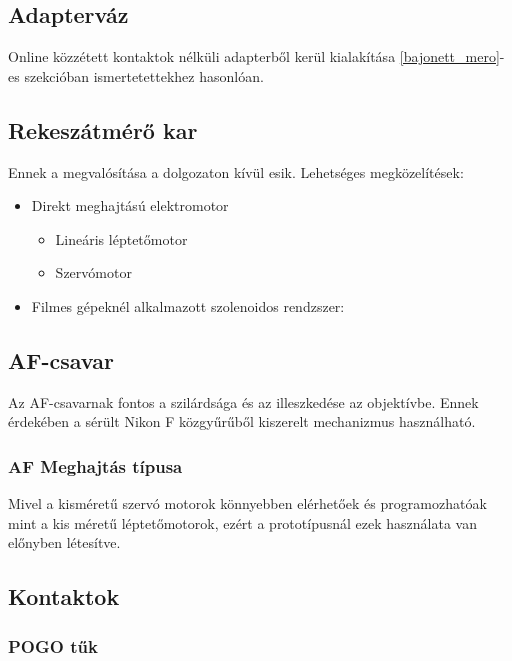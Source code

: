 \subsection{Adapterváz}
Online közzétett kontaktok nélküli adapterből kerül kialakítása \ref{bajonett_mero}-es szekcióban ismertetettekhez hasonlóan.
\subsection{Rekeszátmérő kar}
Ennek a megvalósítása a dolgozaton kívül esik.
Lehetséges megközelítések:
\begin{itemize}
    \item Direkt meghajtású elektromotor
    \begin{itemize}
        \item Lineáris léptetőmotor
        \item Szervómotor
    \end{itemize}
    \item Filmes gépeknél alkalmazott szolenoidos rendzszer:
    \begin{figure}[h]
        [INSERT FIGURE HERE]
    \end{figure}
\end{itemize}
\subsection{AF-csavar}
Az AF-csavarnak fontos a szilárdsága és az illeszkedése az objektívbe.
Ennek érdekében a sérült Nikon F közgyűrűből kiszerelt mechanizmus használható.
\subsubsection{AF Meghajtás típusa} %
Mivel a kisméretű szervó motorok könnyebben elérhetőek és programozhatóak mint a kis méretű léptetőmotorok, ezért a prototípusnál ezek használata van előnyben létesítve.
\subsection{Kontaktok}
\subsubsection{POGO tűk}